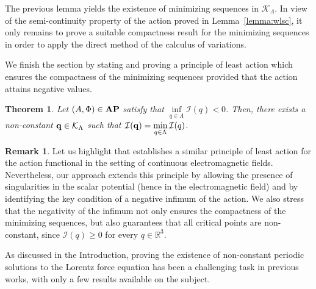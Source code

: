 \documentclass{article}
\newcommand{\boK}{\mathcal{K}}
\newcommand{\boI}{\mathcal{I}}
\newcommand{\R}{\mathbb{R}}
\newcommand{\AP}{\textnormal{\textbf{AP}}}
\newtheorem{theorem}{Theorem}[section]
\theoremstyle{definition}
\newtheorem{remark}{Remark}[section]
\begin{document}
The previous lemma yields the existence of minimizing sequences in $\boK_\Lambda$. In view of the semi-continuity property of the action proved in Lemma~\ref{lemma:wlsc}, it only remains to prove a suitable compactness result for the minimizing sequences in order to apply the direct method of the calculus of variations.

We finish the section by stating and proving a principle of least action which ensures the compactness of the minimizing sequences provided that the action attains negative values. 

\begin{theorem}\label{thm:PLA}
    Let $(A,\Phi)\in\AP$ satisfy that $\inf\limits_{q\in\Lambda}\boI(q)<0$. Then, there exists a non-constant ${\bf q}\in\boK_\Lambda$ such that $\boI({\bf q})=\min\limits_{q\in\Lambda}\boI(q)$.
\end{theorem}

\begin{remark}\label{remark:PLA}
Let us highlight that \cite[Theorem 7]{ABT} establishes a similar principle of least action for the action functional in the setting of continuous electromagnetic fields. Nevertheless, our approach extends this principle by allowing the presence of singularities in the scalar potential (hence in the electromagnetic field) and by identifying the key condition of a negative infimum of the action. We also stress that the negativity of the infimum not only  ensures the compactness of the minimizing sequences, but also guarantees that all critical points are non-constant, since $\boI(q)\geq 0$ for every $q\in\R^3$.

As discussed in the Introduction, proving the existence of non-constant periodic solutions to the Lorentz force equation has been a challenging task in previous works, with only a few results available on the subject.
\end{remark}
\end{document}
